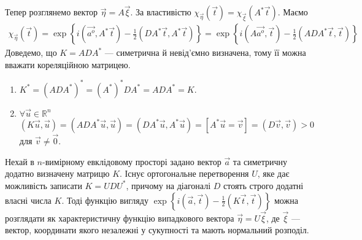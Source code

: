 Тепер розглянемо вектор $\vec{\eta} = A\vec{\xi}$. За властивістю 
$\chi_{\vec{\eta}}(\vec{t}) = \chi_{\vec{\xi}}(A^{*}\vec{t})$. Маємо
\begin{gather*}
    \chi_{\vec{\eta}}(\vec{t}) = \exp\left\{i(\vec{a^o}, A^{*}\vec{t}) - \frac{1}{2}(DA^{*}\vec{t}, A^{*}\vec{t})\right\} =
    \exp\left\{i(A\vec{a^o}, \vec{t}) - \frac{1}{2}(ADA^{*}\vec{t}, \vec{t})\right\}
\end{gather*}
Доведемо, що $K = ADA^{*}$ --- симетрична й невід'ємно визначена, тому її можна вважати кореляційною матрицею.
\begin{enumerate}
    \item $K^{*} = \left( ADA^{*}\right)^{*} = \left( A^{*}\right)^{*}DA^{*} = ADA^{*} = K$.
    \item $\forall \vec{u} \in \mathbb{R}^n$ $\left( K \vec{u}, \vec{u}\right) = \left( ADA^{*} \vec{u}, \vec{u}\right) =
    \left( DA^{*} \vec{u}, A^{*}\vec{u}\right) = \left[ A^{*}\vec{u} = \vec{v}\right] = \left( D\vec{v}, \vec{v}\right) > 0$ для $\vec{v}\neq \vec{0}$.
\end{enumerate}

Нехай в $n$-вимірному евклідовому просторі задано вектор $\vec{a}$ та симетричну додатно визначену матрицю $K$.
Існує ортогональне перетворення $U$, яке дає можливість записати $K=UDU^{*}$, причому на діагоналі $D$ стоять строго додатні
власні числа $K$. Тоді функцію вигляду $\exp\left\{i(\vec{a}, \vec{t}) - \frac{1}{2}(K\vec{t}, \vec{t})\right\}$ 
можна розглядати як характеристичну функцію випадкового вектора $\vec{\eta} = U \vec{\xi}$, де $\vec{\xi}$ ---
вектор, координати якого незалежні у сукупності та мають нормальний розподіл.


